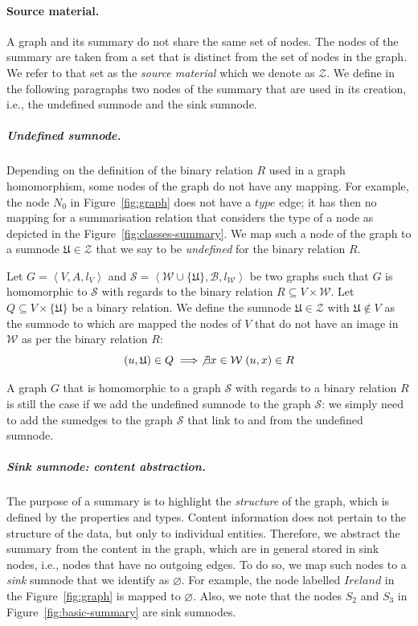 \paragraph{Source material.}

A graph and its summary do not share the same set of nodes. The nodes of the summary are taken from a set that is distinct from the set of nodes in the graph. We refer to that set as the \emph{source material} which we denote as $\mathcal{Z}$. We define in the following paragraphs two nodes of the summary that are used in its creation, i.e., the undefined sumnode and the sink sumnode.

\subparagraph{Undefined sumnode.}
\label{sec:undefined-sumnode}

Depending on the definition of the binary relation $R$ used in a graph homomorphism, some nodes of the graph do not have any mapping. For example, the node $N_0$ in Figure~\ref{fig:graph} does not have a $type$ edge; it has then no mapping for a summarisation relation that considers the type of a node as depicted in the Figure~\ref{fig:classes-summary}.
We map such a node of the graph to a sumnode $\mathfrak{U} \in \mathcal{Z}$ that we say to be \emph{undefined} for the binary relation $R$.

\begin{definition}
Let $G=\left\langle V, A, l_V \right\rangle$ and $\mathcal{S}=\left\langle \mathcal{W} \cup \{ \mathfrak{U} \}, \mathcal{B}, l_\mathcal{W} \right\rangle$ be two graphs such that $G$ is homomorphic to $\mathcal{S}$ with regards to the binary relation $R \subseteq V \times \mathcal{W}$.
Let $Q \subseteq V \times \{ \mathfrak{U} \}$ be a binary relation.
We define the sumnode $\mathfrak{U} \in \mathcal{Z}$ with $\mathfrak{U} \not \in V$ as the sumnode to which are mapped the nodes of $V$ that do not have an image in $\mathcal{W}$ as per the binary relation $R$:
$$
(u, \mathfrak{U}) \in Q \implies \not \exists x \in \mathcal{W}\; (u, x) \in R
$$
\end{definition}

A graph $G$ that is homomorphic to a graph $\mathcal{S}$ with regards to a binary relation $R$ is still the case if we add the undefined sumnode to the graph $\mathcal{S}$: we simply need to add the sumedges to the graph $\mathcal{S}$ that link to and from the undefined sumnode.

\subparagraph{Sink sumnode: content abstraction.}

The purpose of a summary is to highlight the \emph{structure} of the graph, which is defined by the properties and types. Content information does not pertain to the structure of the data, but only to individual entities. Therefore, we abstract the summary from the content in the graph, which are in general stored in sink nodes, i.e., nodes that have no outgoing edges. To do so, we map such nodes to a \emph{sink} sumnode that we identify as $\varnothing$. For example, the node labelled $Ireland$ in the Figure~\ref{fig:graph} is mapped to $\varnothing$. Also, we note that the nodes $S_2$ and $S_3$ in Figure~\ref{fig:basic-summary} are sink sumnodes.

